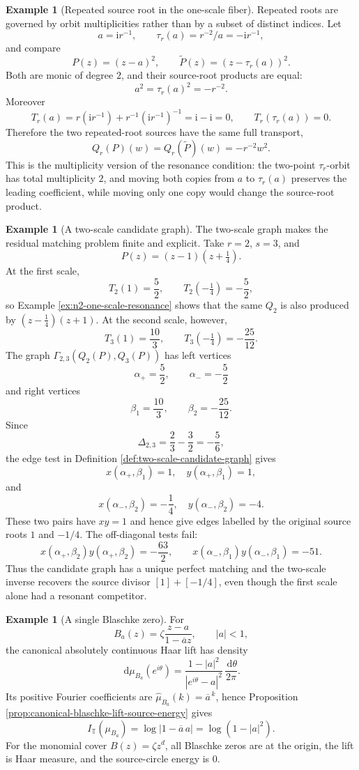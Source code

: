 \documentclass[12pt,a4paper]{article}
\theoremstyle{plain}
\theoremstyle{definition}
\newtheorem{example}[theorem]{Example}
\numberwithin{equation}{section}
\newcommand{\TT}{\mathbb{T}}
\newcommand{\dd}{\,\mathrm{d}}
\newcommand{\ii}{\mathrm{i}}
\begin{document}
\begin{example}[Repeated source root in the one-scale fiber]\label{ex:repeated-root-one-scale-fiber}
Repeated roots are governed by orbit multiplicities rather than by a subset of distinct indices.  Let
\[
a=\ii r^{-1},\qquad \tau_r(a)=r^{-2}/a=-\ii r^{-1},
\]
and compare
\[
P(z)=(z-a)^2,\qquad \widetilde P(z)=(z-\tau_r(a))^2.
\]
Both are monic of degree \(2\), and their source-root products are equal:
\[
a^2=\tau_r(a)^2=-r^{-2}.
\]
Moreover
\[
T_r(a)=r(\ii r^{-1})+r^{-1}(\ii r^{-1})^{-1}
=\ii-\ii=0,
\qquad
T_r(\tau_r(a))=0.
\]
Therefore the two repeated-root sources have the same full transport,
\[
Q_r(P)(w)=Q_r(\widetilde P)(w)=-r^{-2}w^2.
\]
This is the multiplicity version of the resonance condition: the two-point \(\tau_r\)-orbit has total multiplicity \(2\), and moving both copies from \(a\) to \(\tau_r(a)\) preserves the leading coefficient, while moving only one copy would change the source-root product.
\end{example}

\begin{example}[A two-scale candidate graph]\label{ex:two-scale-candidate-graph}
The two-scale graph makes the residual matching problem finite and explicit.  Take \(r=2\), \(s=3\), and
\[
P(z)=(z-1)(z+\tfrac14).
\]
At the first scale,
\[
T_2(1)=\frac52,\qquad T_2(-\tfrac14)=-\frac52,
\]
so Example \ref{ex:n2-one-scale-resonance} shows that the same \(Q_2\) is also produced by \((z-\tfrac14)(z+1)\).  At the second scale, however,
\[
T_3(1)=\frac{10}{3},\qquad
T_3(-\tfrac14)=-\frac{25}{12}.
\]
The graph \(\Gamma_{2,3}(Q_2(P),Q_3(P))\) has left vertices
\[
\alpha_+=\frac52,\qquad \alpha_-=-\frac52
\]
and right vertices
\[
\beta_1=\frac{10}{3},\qquad \beta_2=-\frac{25}{12}.
\]
Since
\[
\Delta_{2,3}=\frac23-\frac32=-\frac56,
\]
the edge test in Definition \ref{def:two-scale-candidate-graph} gives
\[
x(\alpha_+,\beta_1)=1,\quad y(\alpha_+,\beta_1)=1,
\]
and
\[
x(\alpha_-,\beta_2)=-\frac14,\quad y(\alpha_-,\beta_2)=-4.
\]
These two pairs have \(xy=1\) and hence give edges labelled by the original source roots \(1\) and \(-1/4\).  The off-diagonal tests fail:
\[
x(\alpha_+,\beta_2)y(\alpha_+,\beta_2)=-\frac{63}{2},
\qquad
x(\alpha_-,\beta_1)y(\alpha_-,\beta_1)=-51.
\]
Thus the candidate graph has a unique perfect matching and the two-scale inverse recovers the source divisor \([1]+[-1/4]\), even though the first scale alone had a resonant competitor.
\end{example}

\begin{example}[A single Blaschke zero]\label{ex:single-blaschke-zero}
For
\[
B_a(z)=\zeta\frac{z-a}{1-\overline a z},\qquad |a|<1,
\]
the canonical absolutely continuous Haar lift has density
\[
\dd\mu_{B_a}(e^{i\theta})=\frac{1-|a|^2}{|e^{i\theta}-a|^2}\,\frac{\dd\theta}{2\pi}.
\]
Its positive Fourier coefficients are \(\widehat\mu_{B_a}(k)=\overline a^{\,k}\), hence Proposition \ref{prop:canonical-blaschke-lift-source-energy} gives
\[
I_{\TT}(\mu_{B_a})=\log|1-\overline a\,a|=\log(1-|a|^2).
\]
For the monomial cover \(B(z)=\zeta z^d\), all Blaschke zeros are at the origin, the lift is Haar measure, and the source-circle energy is \(0\).
\end{example}
\end{document}
